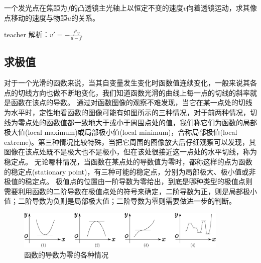 \begin{example}
	一个发光点在焦距为$f$的凸透镜主光轴上以恒定不变的速度$v$向着透镜运动，求其像点移动的速度与物距$u$的关系。
	\begin{taggedblock}{teacher}
		\newline
		解析：$v'=-\frac{f^2v}{u-f}$
	\end{taggedblock}
\end{example}%

\subsection{求极值}
对于一个光滑的函数来说，当其自变量发生变化时函数值连续变化，一般来说其各点的切线方向也做不断地变化，我们知道函数光滑的曲线上每一点的切线的斜率就是函数在该点的导数。
通过对函数图像的观察不难发现，当它在某一点处的切线为水平时，定性地看函数的图像可能有如图所示的三种情况，对于前两种情况，切线为零点处的函数值都一致地大于或小于周围点处的值，我们称它们为函数的{\heiti 局部极大值}(local maximum)或{\heiti 局部极小值}(local minimum)，合称{\heiti 局部极值}(local extreme)。第三种情况比较特殊，当把它周围的图像放大后仔细观察可以发现，其图像在该点处既不是极大也不是极小，但在该处很接近这一点处的水平切线，称为稳定点。
无论哪种情况，当函数在某点处的导数值为零时，都称这样的点为函数的{\heiti 稳定点}(stationary point)，有三种可能的稳定点，分别为局部极大、极小值或非极值的稳定点。
极值点的位置由一阶导数为零给出，到底是哪种类型的极值点则需要利用函数的二阶导数在极值点处的符号来确定，二阶导数为正，则是局部极小值；二阶导数为负则是局部极大值；二阶导数为零则需要做进一步的判断。
\begin{figure}[hbtp]
\centering
\includegraphics[width=0.9\textwidth]{images/cal-1.pdf}
\caption{函数的导数为零的各种情况}
\end{figure}

